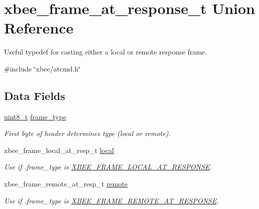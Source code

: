 \hypertarget{unionxbee__frame__at__response__t}{}\section{xbee\+\_\+frame\+\_\+at\+\_\+response\+\_\+t Union Reference}
\label{unionxbee__frame__at__response__t}


Useful typedef for casting either a local or remote response frame.  




{\ttfamily \#include \char`\"{}xbee/atcmd.\+h\char`\"{}}

\subsection*{Data Fields}
\begin{DoxyCompactItemize}
\item 
\mbox{\label{unionxbee__frame__at__response__t_afa34d393db5fa915716b483011415ddc}} 
\hyperlink{group__hal__dos_gae1affc9ca37cfb624959c866a73f83c2}{uint8\+\_\+t} \hyperlink{unionxbee__frame__at__response__t_afa34d393db5fa915716b483011415ddc}{frame\+\_\+type}
\begin{DoxyCompactList}\small\item\em First byte of header determines type (local or remote). \end{DoxyCompactList}\item 
\mbox{\label{unionxbee__frame__at__response__t_a380a2d41c59919bb281ca9c33787d583}} 
xbee\+\_\+frame\+\_\+local\+\_\+at\+\_\+resp\+\_\+t \hyperlink{unionxbee__frame__at__response__t_a380a2d41c59919bb281ca9c33787d583}{local}
\begin{DoxyCompactList}\small\item\em Use if .frame\+\_\+type is \hyperlink{group__xbee__device_gga7753bbebaf00d6d64942f64b6ae9b7b9ae66771334070219cd098c8201936cf4a}{X\+B\+E\+E\+\_\+\+F\+R\+A\+M\+E\+\_\+\+L\+O\+C\+A\+L\+\_\+\+A\+T\+\_\+\+R\+E\+S\+P\+O\+N\+SE}. \end{DoxyCompactList}\item 
\mbox{\label{unionxbee__frame__at__response__t_a7366e5c04e76199eb50b874e50744d34}} 
xbee\+\_\+frame\+\_\+remote\+\_\+at\+\_\+resp\+\_\+t \hyperlink{unionxbee__frame__at__response__t_a7366e5c04e76199eb50b874e50744d34}{remote}
\begin{DoxyCompactList}\small\item\em Use if .frame\+\_\+type is \hyperlink{group__xbee__device_gga7753bbebaf00d6d64942f64b6ae9b7b9a3cd726459592fab4cdc9b5e6bbecb79f}{X\+B\+E\+E\+\_\+\+F\+R\+A\+M\+E\+\_\+\+R\+E\+M\+O\+T\+E\+\_\+\+A\+T\+\_\+\+R\+E\+S\+P\+O\+N\+SE}. \end{DoxyCompactList}\end{DoxyCompactItemize}


